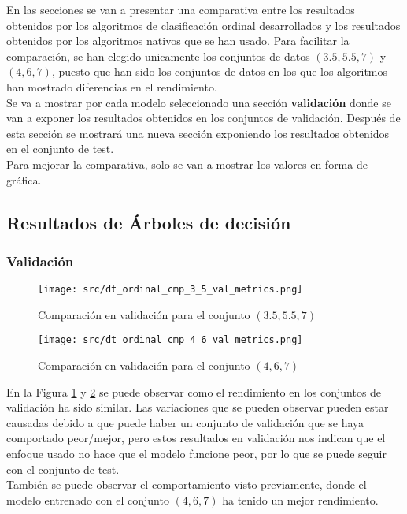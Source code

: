 En las secciones se van a presentar una comparativa entre los resultados obtenidos por los algoritmos de clasificación ordinal desarrollados y los resultados obtenidos por los algoritmos nativos que se han usado. Para facilitar la comparación, se han elegido unicamente los conjuntos de datos $(3.5,5.5,7)$  y $(4,6,7)$, puesto que han sido los conjuntos de datos en los que los algoritmos han mostrado diferencias en el rendimiento.\\
Se va a mostrar por cada modelo seleccionado una sección \textbf{validación} donde se van a exponer los resultados obtenidos en los conjuntos de validación. Después de esta sección se mostrará una nueva sección exponiendo los resultados obtenidos en el conjunto de test.\\
\linebreak
Para mejorar la comparativa, solo se van a mostrar los valores en forma de gráfica.
\clearpage
\subsection{Resultados de Árboles de decisión}
\label{sec:ord_cmp_dt}
\subsubsection*{Validación}
\begin{figure}[H]
	\centering
	\texttt{[image: src/dt\_ordinal\_cmp\_3\_5\_val\_metrics.png]}
	\caption{Comparación en validación para el conjunto  $(3.5,5.5,7)$ }
	\label{fig:dt_ordin_val_cmp_1}
\end{figure}
\begin{figure}[H]
	\centering
	\texttt{[image: src/dt\_ordinal\_cmp\_4\_6\_val\_metrics.png]}
	\caption{Comparación en validación para el conjunto $(4,6,7)$}
	\label{fig:dt_ordin_val_cmp_2}
\end{figure}
En la Figura \ref{fig:dt_ordin_val_cmp_1} y \ref{fig:dt_ordin_val_cmp_2} se puede observar como el rendimiento en los conjuntos de validación ha sido similar. Las variaciones que se pueden observar pueden estar causadas debido a que puede haber un conjunto de validación que se haya comportado peor/mejor, pero estos resultados en validación nos indican que el enfoque usado no hace que el modelo funcione peor, por lo que se puede seguir con el conjunto de test.\\
También se puede observar el comportamiento visto previamente, donde el modelo entrenado con el conjunto $(4,6,7)$ ha tenido un mejor rendimiento.
\clearpage

